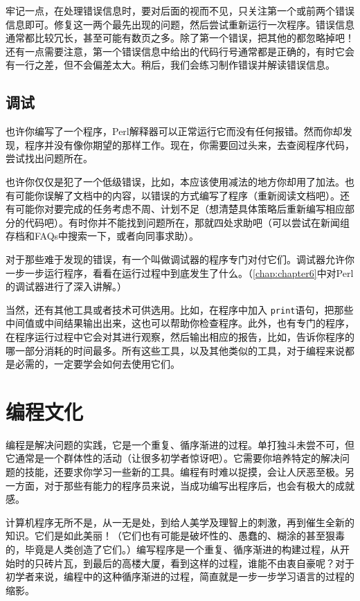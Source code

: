 牢记一点，在处理错误信息时，要对后面的视而不见，只关注第一个或前两个错误信息即可。修复这一两个最先出现的问题，然后尝试重新运行一次程序。错误信息通常都比较冗长，甚至可能有数页之多。除了第一个错误，把其他的都忽略掉吧！还有一点需要注意，第一个错误信息中给出的代码行号通常都是正确的，有时它会有一行之差，但不会偏差太大。稍后，我们会练习制作错误并解读错误信息。

\subsection{调试}
也许你编写了一个程序，Perl解释器可以正常运行它而没有任何报错。然而你却发现，程序并没有像你期望的那样工作。现在，你需要回过头来，去查阅程序代码，尝试找出问题所在。

也许你仅仅是犯了一个低级错误，比如，本应该使用减法的地方你却用了加法。也有可能你误解了文档中的内容，以错误的方式编写了程序（重新阅读文档吧）。还有可能你对要完成的任务考虑不周、计划不足（想清楚具体策略后重新编写相应部分的代码吧）。有时你并不能找到问题所在，那就四处求助吧（可以尝试在新闻组存档和FAQs中搜索一下，或者向同事求助）。

对于那些难于发现的错误，有一个叫做调试器的程序专门对付它们。调试器允许你一步一步运行程序，看看在运行过程中到底发生了什么。（\autoref{chap:chapter6}中对Perl的调试器进行了深入讲解。）

当然，还有其他工具或者技术可供选用。比如，在程序中加入 \verb|print|语句，把那些中间值或中间结果输出出来，这也可以帮助你检查程序。此外，也有专门的程序，在程序运行过程中它会对其进行观察，然后输出相应的报告，比如，告诉你程序的哪一部分消耗的时间最多。所有这些工具，以及其他类似的工具，对于编程来说都是必需的，一定要学会如何去使用它们。

\section{编程文化}
编程是解决问题的实践，它是一个重复、循序渐进的过程。单打独斗未尝不可，但它通常是一个群体性的活动（让很多初学者惊讶吧）。它需要你培养特定的解决问题的技能，还要求你学习一些新的工具。编程有时难以捉摸，会让人厌恶至极。另一方面，对于那些有能力的程序员来说，当成功编写出程序后，也会有极大的成就感。

计算机程序无所不是，从一无是处，到给人美学及理智上的刺激，再到催生全新的知识。它们是如此美丽！（它们也有可能是破坏性的、愚蠢的、糊涂的甚至狠毒的，毕竟是人类创造了它们。）编写程序是一个重复、循序渐进的构建过程，从开始时的只砖片瓦，到最后的高楼大厦，看到这样的过程，谁能不由衷自豪呢？对于初学者来说，编程中的这种循序渐进的过程，简直就是一步一步学习语言的过程的缩影。

